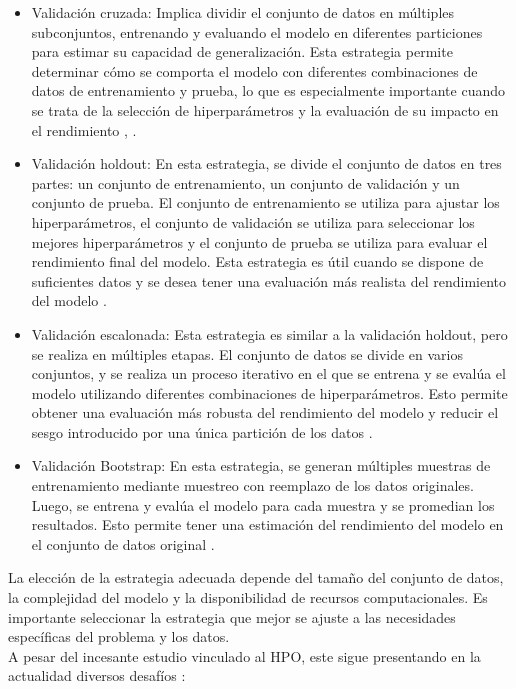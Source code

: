 \begin{itemize}
	\item Validación cruzada: Implica dividir el conjunto de datos en múltiples subconjuntos, entrenando y evaluando el modelo en diferentes particiones para estimar su capacidad de generalización. Esta estrategia permite determinar cómo se comporta el modelo con diferentes combinaciones de datos de entrenamiento y prueba, lo que es especialmente importante cuando se trata de la selección de hiperparámetros y la evaluación de su impacto en el rendimiento \citep{hastie2009elements}, \citep{bishop2006pattern}.
	\item Validación holdout: En esta estrategia, se divide el conjunto de datos en tres partes: un conjunto de entrenamiento, un conjunto de validación y un conjunto de prueba. El conjunto de entrenamiento se utiliza para ajustar los hiperparámetros, el conjunto de validación se utiliza para seleccionar los mejores hiperparámetros y el conjunto de prueba se utiliza para evaluar el rendimiento final del modelo. Esta estrategia es útil cuando se dispone de suficientes datos y se desea tener una evaluación más realista del rendimiento del modelo \citep{bishop2006pattern}.
	\item Validación escalonada: Esta estrategia es similar a la validación holdout, pero se realiza en múltiples etapas. El conjunto de datos se divide en varios conjuntos, y se realiza un proceso iterativo en el que se entrena y se evalúa el modelo utilizando diferentes combinaciones de hiperparámetros. Esto permite obtener una evaluación más robusta del rendimiento del modelo y reducir el sesgo introducido por una única partición de los datos \citep{hastie2009elements}.
	\item Validación Bootstrap: En esta estrategia, se generan múltiples muestras de entrenamiento mediante muestreo con reemplazo de los datos originales. Luego, se entrena y evalúa el modelo para cada muestra y se promedian los resultados. Esto permite tener una estimación del rendimiento del modelo en el conjunto de datos original \citep{davison1997bootstrap}.
\end{itemize}
La elección de la estrategia adecuada depende del tamaño del conjunto de datos, la complejidad del modelo y la disponibilidad de recursos computacionales. Es importante seleccionar la estrategia que mejor se ajuste a las necesidades específicas del problema y los datos. \\
A pesar del incesante estudio vinculado al HPO, este sigue presentando en la actualidad diversos desafíos \citep{hutter2019automated}:
